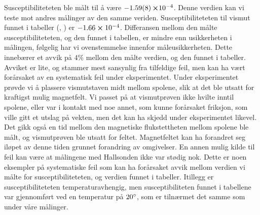 \documentclass[%
 reprint,
 amsmath,amssymb,
 aps,
 norsk,
]{revtex4-1}
\begin{document}
Susceptibiliteteten ble målt til å være $-\SI{1.59\pm0.08}\cross 10^{-4}$. Denne verdien kan vi teste mot andres målinger av den samme veriden. Susceptibiliteteten til vismut funnet i tabeller (\cite{noauthor_magnetic_nodate}, \cite{noauthor_magnetic_2018}) er $-1.66\cross 10^{-4}$. Differansen mellom den målte susceptibiliteteten, og den funnet i tabellen, er mindre enn usikkerheten i målingen, følgelig har vi ovenstemmelse innenfor måleusikkerheten. Dette innebærer et avvik på $4\%$ mellom den målte verdien, og den funnet i tabeller. Avviket er lite, og stammer mest sansynlig fra tilfeldige feil, men kan ha vært forårsaket av en systematisk feil under eksperimentet. Under eksperimentet prøvde vi å plassere vismutstaven midt mellom spolene, slik at det ble utsatt for kraftigst mulig magnetfelt. Vi passet på at vismutprøven ikke hvilte inntil spolene, eller var i kontakt med noe annet, som kunne forårsaket friksjon, som ville gitt et utslag på vekten, men det kan ha skjedd under eksperimentet likevel. Det gikk også en tid mellom den magnetiske flukstettheten mellom spolene ble målt, og vismutprøven ble utsatt for feltet. Magnetfeltet kan ha forandret seg iløpet av denne tiden grunnet forandring av omgivelser. En annen mulig kilde til feil kan være at målingene med Hallsonden ikke var stødig nok. Dette er noen eksempler på systematiske feil som kan ha forårsaket avvik mellom verdien vi målte for susceptibiliteteten, og verdien funnet i tabeller. Itillegg er susceptibiliteteten temperaturavhengig, men susceptibiliteten funnet i tabellene var gjennomført ved en temperatur på
$20\degree$, som er tilnærmet det samme som under våre målinger.
\end{document}
